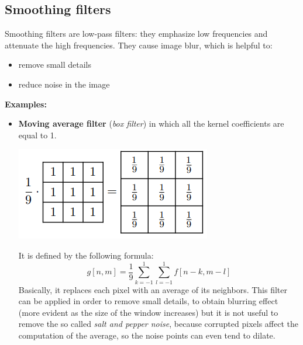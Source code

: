 \subsection{Smoothing filters}
Smoothing filters are low-pass filters: they emphasize low frequencies and attenuate the high frequencies. They cause image blur, which is helpful to:
\begin{itemize}
    \item remove small details
    \item reduce noise in the image
\end{itemize}
\textbf{Examples:}
\begin{itemize}
    \item \textbf{Moving average filter} (\textit{box filter}) in which all the kernel coefficients are equal to 1.
    \begin{center}
        \includegraphics[]{images/box filter.png}
    \end{center}
    It is defined by the following formula:
    \[g[n,m] = \frac{1}{9}\sum_{k=-1}^{1}\sum_{l=-1}^{1}f[n-k, m-l]\]
    Basically, it replaces each pixel with an average of its neighbors. This filter can be applied in order to remove small details, to obtain blurring effect (more evident as the size of the window increases) but it is not useful to remove the so called \textit{salt and pepper noise}, because corrupted pixels affect the computation of the average, so the noise points can even tend to dilate.
    

\end{itemize}
